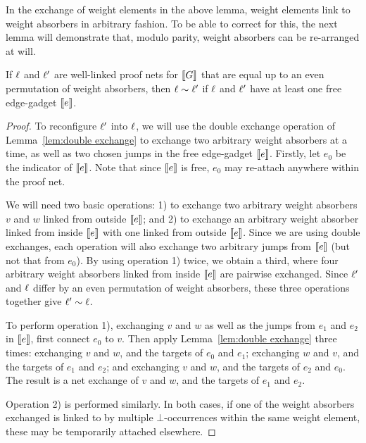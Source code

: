 \documentclass{lmcs}
\begin{document}
In the exchange of weight elements in the above lemma, weight elements link to weight absorbers in arbitrary fashion. To be able to correct for this, the next lemma will demonstrate that, modulo parity, weight absorbers can be re-arranged at will.

\begin{lemma}
\label{lem:permute weight absorbers}
If $\ell$ and $\ell'$ are well-linked proof nets for $\llbracket G\rrbracket$ that are equal up to an even permutation of weight absorbers, then $\links\perm\links'$ if $\ell$ and $\ell'$ have at least one free edge-gadget $\llbracket e\rrbracket$.
\end{lemma}

\begin{proof}
To reconfigure $\ell'$ into $\ell$, we will use the double exchange operation of Lemma~\ref{lem:double exchange} to exchange two arbitrary weight absorbers at a time, as well as two chosen jumps in the free edge-gadget $\llbracket e\rrbracket$.
%
Firstly, let $e_0$ be the indicator of $\llbracket e\rrbracket$.
%
Note that since $\llbracket e\rrbracket$ is free, $e_0$ may re-attach anywhere within the proof net.


We will need two basic operations: 1) to exchange two arbitrary weight absorbers $v$ and $w$ linked from outside $\llbracket e\rrbracket$; and 2) to exchange an arbitrary weight absorber linked from inside $\llbracket e\rrbracket$ with one linked from outside $\llbracket e\rrbracket$.
%
Since we are using double exchanges, each operation will also exchange two arbitrary jumps from $\llbracket e\rrbracket$ (but not that from $e_0$).
%
By using operation 1) twice, we obtain a third, where four arbitrary weight absorbers linked from inside $\llbracket e\rrbracket$ are pairwise exchanged.
%
Since $\ell'$ and $\ell$ differ by an even permutation of weight absorbers, these three operations together give $\ell'\sim\ell$.


To perform operation 1), exchanging $v$ and $w$ as well as the jumps from $e_1$ and $e_2$ in $\llbracket e\rrbracket$, first connect $e_0$ to $v$.
%
Then apply Lemma~\ref{lem:double exchange} three times: exchanging $v$ and $w$, and the targets of $e_0$ and $e_1$; exchanging $w$ and $v$, and the targets of $e_1$ and $e_2$; and exchanging $v$ and $w$, and the targets of $e_2$ and $e_0$.
%
The result is a net exchange of $v$ and $w$, and the targets of $e_1$ and $e_2$.


Operation 2) is performed similarly.
%
In both cases, if one of the weight absorbers exchanged is linked to by multiple $\bot$-occurrences within the same weight element, these may be temporarily attached elsewhere.
%
\end{proof}
\end{document}
